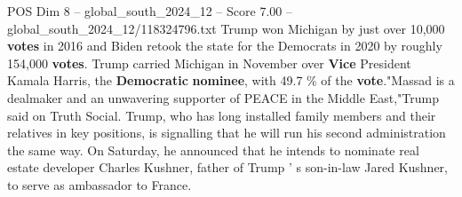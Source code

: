 \begin{textsample}{POS Dim 8 – global\_south\_2024\_12 – Score 7.00 – global\_south\_2024\_12/118324796.txt}
Trump won Michigan by just over 10,000 \textbf{votes} in 2016 and Biden retook the state for the Democrats in 2020 by roughly 154,000 \textbf{votes}.
Trump carried Michigan in November over \textbf{Vice} President Kamala Harris, the \textbf{Democratic} \textbf{nominee}, with 49.7 \% of the \textbf{vote}."Massad is a dealmaker and an unwavering supporter of PEACE in the Middle East,"Trump said on Truth Social.
Trump, who has long installed family members and their relatives in key positions, is signalling that he will run his second administration the same way.
On Saturday, he announced that he intends to nominate real estate developer Charles Kushner, father of Trump ' s son-in-law Jared Kushner, to serve as ambassador to France.

\end{textsample}
